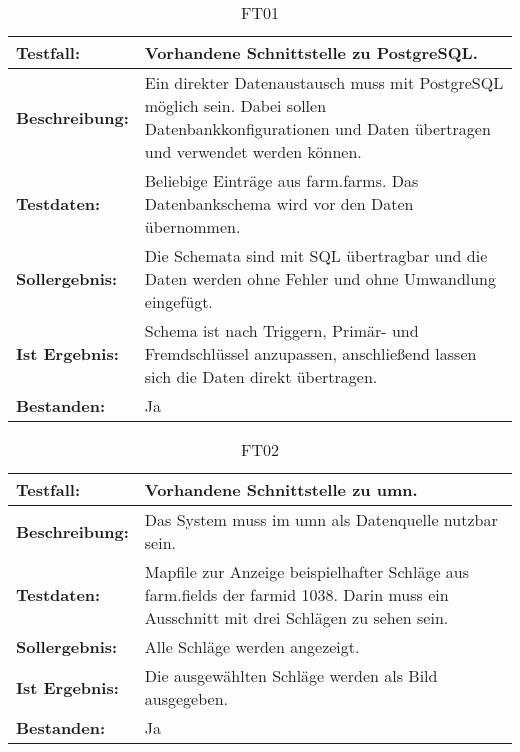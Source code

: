 \label{appendix:funktionstests} 
\capstartfalse
\begin{table}[h!]
\centering
\small
\begin{tabular}{p{2.8cm}|p{12cm}}
\textbf{Testfall:} & Vorhandene Schnittstelle zu PostgreSQL. \\ \hline
\textbf{Beschreibung:} & Ein direkter Datenaustausch muss mit PostgreSQL möglich sein. Dabei sollen Datenbankkonfigurationen und Daten übertragen und verwendet werden können. \\ \hline
\textbf{Testdaten:} & Beliebige Einträge aus farm.farms. Das Datenbankschema wird vor den Daten übernommen. \\ \hline
\textbf{Sollergebnis:} & Die Schemata sind mit SQL übertragbar und die Daten werden ohne Fehler und ohne Umwandlung eingefügt. \\ \hline
\textbf{Ist Ergebnis:} & Schema ist nach Triggern, Primär- und Fremdschlüssel anzupassen, anschließend lassen sich die Daten direkt übertragen. \\ \hline
\textbf{Bestanden:} & Ja \\
\end{tabular}
\caption*{FT01}
\end{table}

\begin{table}[h!]
\centering
\small
\begin{tabular}{p{2.8cm}|p{12cm}}
\textbf{Testfall:} & Vorhandene Schnittstelle zu \Gls{umn}. \\ \hline
\textbf{Beschreibung:} & Das System muss im \Gls{umn} als Datenquelle nutzbar sein. \\ \hline
\textbf{Testdaten:} & Mapfile zur Anzeige beispielhafter Schläge aus farm.fields der farmid 1038. Darin muss ein Ausschnitt mit drei Schlägen zu sehen sein. \\ \hline
\textbf{Sollergebnis:} & Alle Schläge werden angezeigt. \\ \hline
\textbf{Ist Ergebnis:} & Die ausgewählten Schläge werden als Bild ausgegeben. \\ \hline
\textbf{Bestanden:} & Ja \\
\end{tabular}
\caption*{FT02}
\end{table}

